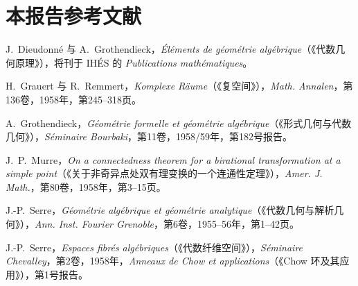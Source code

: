 \section*{本报告参考文献}
\begin{enumerate}[label={[\arabic*]}]
\item J.~Dieudonné 与 A.~Grothendieck，\emph{Éléments de géométrie algébrique}（《代数几何原理》），将刊于 IHÉS 的 \emph{Publications mathématiques}。
\item H.~Grauert 与 R.~Remmert，\emph{Komplexe Räume}（《复空间》），\emph{Math. Annalen}，第136卷，1958年，第245--318页。
\item A.~Grothendieck，\emph{Géométrie formelle et géométrie algébrique}（《形式几何与代数几何》），\emph{Séminaire Bourbaki}，第11卷，1958/59年，第182号报告。
\item J.~P.~Murre，\emph{On a connectedness theorem for a birational transformation at a simple point}（《关于非奇异点处双有理变换的一个连通性定理》），\emph{Amer. J. Math.}，第80卷，1958年，第3--15页。
\item J.-P.~Serre，\emph{Géométrie algébrique et géométrie analytique}（《代数几何与解析几何》），\emph{Ann. Inst. Fourier Grenoble}，第6卷，1955--56年，第1--42页。
\item J.-P.~Serre，\emph{Espaces fibrés algébriques}（《代数纤维空间》），\emph{Séminaire Chevalley}，第2卷，1958年，\emph{Anneaux de Chow et applications}（《Chow 环及其应用》），第1号报告。
\end{enumerate}
